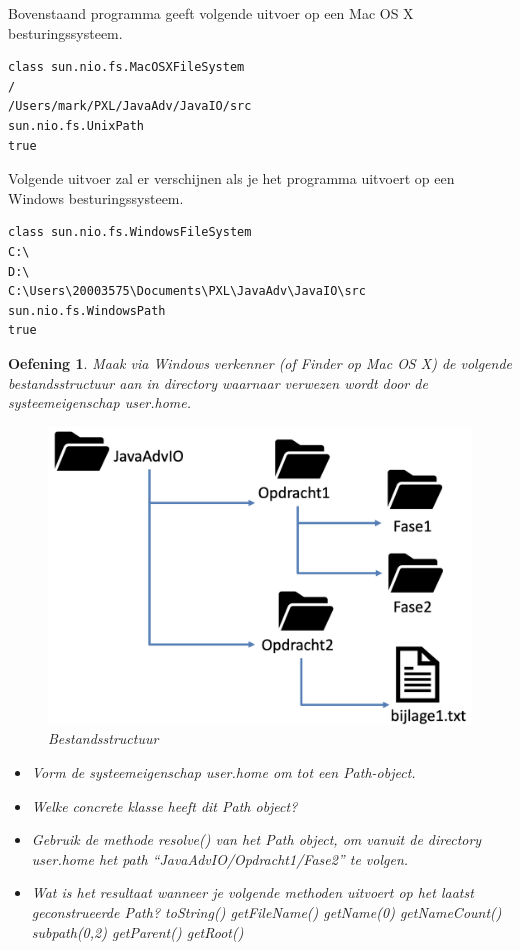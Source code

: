 \documentclass{tstextbook}
\newtheorem{envoefening}{Oefening}[chapter]
\newenvironment{oefening}
               {\begin{boxexercise}\begin{envoefening}}
               {\end{envoefening}\end{boxexercise}}
\begin{document}
Bovenstaand programma geeft volgende uitvoer op een Mac OS X besturingssysteem.

\begin{verbatim}
class sun.nio.fs.MacOSXFileSystem
/
/Users/mark/PXL/JavaAdv/JavaIO/src
sun.nio.fs.UnixPath
true
\end{verbatim}

Volgende uitvoer zal er verschijnen als je het programma uitvoert op een Windows besturingssysteem.

\begin{verbatim}
class sun.nio.fs.WindowsFileSystem
C:\
D:\
C:\Users\20003575\Documents\PXL\JavaAdv\JavaIO\src
sun.nio.fs.WindowsPath
true
\end{verbatim}


\begin{oefening}
Maak via Windows verkenner (of Finder op Mac OS X) de volgende bestandsstructuur aan in directory waarnaar verwezen wordt door de systeemeigenschap \textit{user.home}.

\begin{figure}[H]
  \includegraphics[width=\linewidth]{images/h8/opgave1.png}
  \caption{Bestandsstructuur}
  \label{fig:paths}
\end{figure}

\begin{itemize}
\item Vorm de systeemeigenschap user.home om tot een Path-object.
\item Welke concrete klasse heeft dit Path object?
\item Gebruik de methode resolve() van het Path object, om vanuit de directory user.home het path ``JavaAdvIO/Opdracht1/Fase2'' te volgen.
\item Wat is het resultaat wanneer je volgende methoden uitvoert op het laatst geconstrueerde Path?
\subitem toString()
\subitem getFileName()
\subitem getName(0)
\subitem getNameCount()
\subitem subpath(0,2)
\subitem getParent()
\subitem getRoot()
\end{itemize}
\end{oefening}
\end{document}
